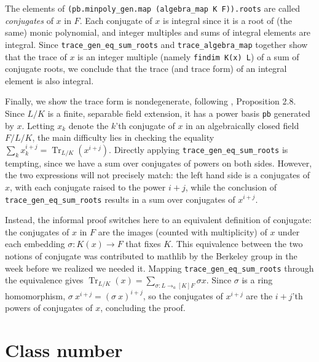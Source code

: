 \documentclass[a4paper,USenglish,cleveref, autoref, thm-restate]{lipics-v2021}
\newcommand{\lean}[1]{\texttt{#1}\xspace} %
\DeclareMathOperator{\Tr}{\mathrm{Tr}}
\newcommand{\mathlib}{\textsf{mathlib}\xspace}
\begin{document}
The elements of \lean{(pb.minpoly\_gen.map (algebra\_map K F)).roots} are called \emph{conjugates} of $x$ in $F$.
Each conjugate of $x$ is integral since it is a root of (the same) monic polynomial,
and integer multiples and sums of integral elements are integral.
Since \lean{trace\_gen\_eq\_sum\_roots} and \lean{trace\_algebra\_map} together show that the trace of $x$ is an integer multiple (namely \lean{findim K(x) L}) of a sum of conjugate roots,
we conclude that the trace (and trace form) of an integral element is also integral.

Finally, we show the trace form is nondegenerate, following \cite{Neukirch}, Proposition 2.8.
Since $L / K$ is a finite, separable field extension, it has a power basis \lean{pb} generated by $x$.
Letting $x_k$ denote the $k$'th conjugate of $x$ in an algebraically closed field $F / L / K$,
the main difficulty lies in checking the equality $\sum_k x_k^{i + j} = \Tr_{L / K} (x^{i + j})$.
Directly applying \lean{trace\_gen\_eq\_sum\_roots} is tempting, since we have a sum over conjugates of powers on both sides.
However, the two expressions will not precisely match: the left hand side is a conjugates of $x$, with each conjugate raised to the power $i + j$,
while the conclusion of \lean{trace\_gen\_eq\_sum\_roots} results in a sum over conjugates of $x^{i + j}$.

Instead, the informal proof switches here to an equivalent definition of conjugate:
the conjugates of $x$ in $F$ are the images (counted with multiplicity) of $x$ under each embedding $\sigma : K(x) \to F$ that fixes $K$.
This equivalence between the two notions of conjugate was contributed to \mathlib by the Berkeley group in the week before we realized we needed it.
Mapping \lean{trace\_gen\_eq\_sum\_roots} through the equivalence gives
$\Tr_{L / K}(x) = \sum_{σ : L \to_a[K] F} \sigma x$.
Since $\sigma$ is a ring homomorphism, $\sigma\ x^{i + j} = (\sigma\ x)^{i + j}$,
so the conjugates of $x^{i + j}$ are the $i + j$'th powers of conjugates of $x$, concluding the proof.

\section{Class number} \label{sec:class-number}
\end{document}

